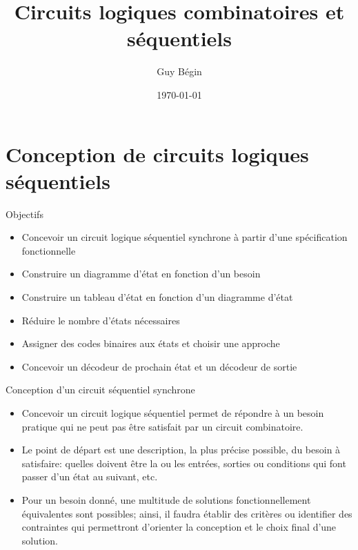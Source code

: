 \documentclass[presentation]{beamer}
\author{Guy Bégin}
\date{\today}
\title{Circuits logiques combinatoires et séquentiels}
\begin{document}
\maketitle

\section{Conception de circuits logiques séquentiels}
\label{sec:org5a25d5c}
\begin{frame}[label={sec:orgfd158c6}]{Objectifs}
\begin{itemize}
\item Concevoir un circuit logique séquentiel synchrone à partir
d'une spécification fonctionnelle
\item Construire un diagramme d'état en fonction d'un besoin
\item Construire un tableau d'état en fonction d'un diagramme d'état
\item Réduire le nombre d'états nécessaires
\item Assigner des codes binaires aux états et 
choisir une approche
\item Concevoir un décodeur de prochain état et un décodeur de sortie
\end{itemize}
\end{frame}

\begin{frame}[label={sec:orgd64b532}]{Conception d'un circuit séquentiel synchrone}
\begin{itemize}
\item Concevoir un circuit logique séquentiel permet de répondre à un besoin pratique qui ne peut pas être satisfait par un circuit combinatoire.

\item Le point de départ est une description, la plus précise possible, du besoin à satisfaire: quelles doivent être la ou les entrées,  sorties ou conditions qui font passer d'un état au suivant, etc.

\item Pour un besoin donné, une multitude de solutions fonctionnellement équivalentes sont possibles; ainsi, il faudra établir des critères ou identifier des contraintes qui permettront d'orienter la conception et le choix final d'une solution.
\end{itemize}
\end{frame}
\end{document}
